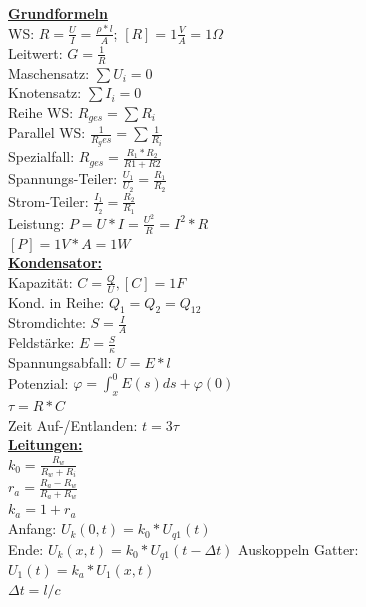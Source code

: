 \documentclass[11pt]{article}
\begin{document}
\begin{landscape}

\begin{minipage}{0.45\textwidth}
\underline{\textbf{Grundformeln}}\\
WS: $R = \frac{U}{I} = \frac{\rho * l}{A}$; $[R] = 1\frac{V}{A} =1 \Omega$ \\
Leitwert: $G = \frac{1}{R}$\\
Maschensatz: $\sum U_i = 0$\\
Knotensatz: $\sum I_i = 0$\\
Reihe WS: $R_{ges} = \sum R_i$\\
Parallel WS: $\frac{1}{R_ges} = \sum \frac{1}{R_i}$\\
\phantom{ss} Spezialfall: $R_{ges} = \frac{R_1 * R_2}{R1+R2} $\\
Spannungs-Teiler: $\frac{U_1}{U_2} = \frac{R_1}{R_2}$\\
Strom-Teiler: $\frac{I_1}{I_2} = \frac{R_2}{R_1}$\\
Leistung: $P =U*I = \frac{U^2}{R} = I^2*R $ \\
\phantom{ssssssssss} $[P] = 1V*A =1 W$\\
\underline{\textbf{Kondensator:}}\\
Kapazität: $C = \frac{Q}{U}, [C]=1F$\\
Kond. in Reihe: $Q_1 = Q_2 = Q_{12}$\\
Stromdichte: $S=\frac{I}{A}$\\
Feldstärke: $E=\frac{S}{\kappa}$\\
Spannungsabfall: $U=E*l$\\
Potenzial: $\varphi = \int_x^0 E(s)ds + \varphi(0)$\\
$\tau = R*C$\\
Zeit Auf-/Entlanden: $t = 3\tau$\\
\underline{\textbf{Leitungen:}}\\
$k_0 = \frac{R_w}{R_w + R_i} $\\
$r_a = \frac{R_a - R_w}{R_a + R_w} $\\
$k_a = 1 + r_a$\\
Anfang: $U_k(0,t)=k_0*U_{q1}(t)$\\
Ende: $U_k(x,t)= k_0*U_{q1}(t-\Delta t)$
Auskoppeln Gatter:\\
\phantom{ss} $U_1(t) = k_a * U_1(x,t)$\\
$\Delta t = l/c$\\
\end{minipage}%
~~~~~~~
\begin{minipage}{0.3\textwidth}

\end{minipage}
\end{landscape}
\end{document}
